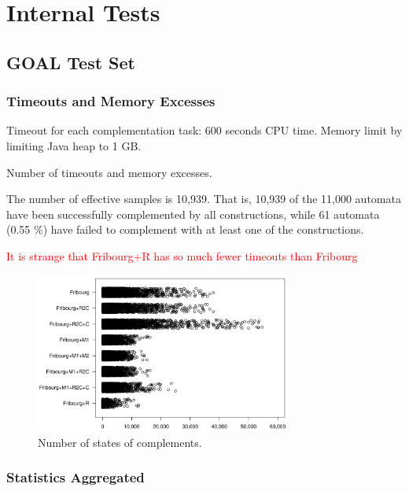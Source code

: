\section{Internal Tests}

\subsection{GOAL Test Set}

\subsubsection{Timeouts and Memory Excesses}

Timeout for each complementation task: 600 seconds CPU time. Memory limit by limiting Java heap to 1 GB.

\begin{table}[ht]
\centering

\caption{Number of timeouts and memory excesses.}
\end{table}


The number of effective samples is 10,939. That is, 10,939 of the 11,000 automata have been successfully complemented by all constructions, while 61 automata (0.55 \%) have failed to complement with at least one of the constructions.

\textcolor{red}{It is strange that Fribourg+R has so much fewer timeouts than Fribourg}

\begin{figure}[ht]
\centering
\includegraphics[width=0.75\textwidth]{figures/r/internal/goal/s.stripchart.pdf}
\caption{Number of states of complements.}
\end{figure}


\subsubsection{Statistics Aggregated}

